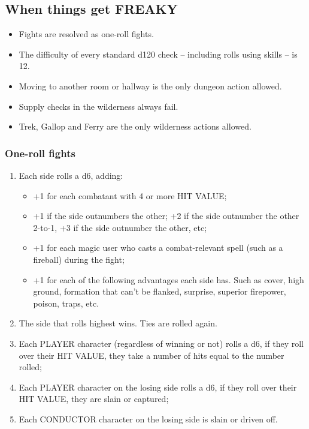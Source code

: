 \subsection{When things get FREAKY}
\begin{itemize}
    \item {Fights are resolved as one-roll fights.}
    \item {The difficulty of every standard d120 check -- including rolls using skills -- is 12.}
    \item {Moving to another room or hallway is the only dungeon action allowed.}
    \item {Supply checks in the wilderness always fail.}
    \item {Trek, Gallop and Ferry are the only wilderness actions allowed.}
\end{itemize}

\subsubsection{One-roll fights}
\begin{enumerate}
    \item {Each side rolls a d6, adding:}
    \begin{itemize}
        \item {+1 for each combatant with 4 or more HIT VALUE;}
        \item {+1 if the side outnumbers the other; +2 if the side outnumber the other 2-to-1, +3 if the side outnumber the other, etc;}
        \item {+1 for each magic user who casts a combat-relevant spell (such as a fireball) during the fight;}
        \item {+1 for each of the following advantages each side has. Such as cover, high ground, formation that can't be flanked, surprise, superior firepower, poison, traps, etc.}
    \end{itemize}
    \item {The side that rolls highest wins. Ties are rolled again.}
    \item {Each PLAYER character (regardless of winning or not) rolls a d6, if they roll over their HIT VALUE, they take a number of hits equal to the number rolled;}
    \item {Each PLAYER character on the losing side rolls a d6, if they roll over their HIT VALUE, they are slain or captured;}
    \item {Each CONDUCTOR character on the losing side is slain or driven off.}
\end{enumerate}

